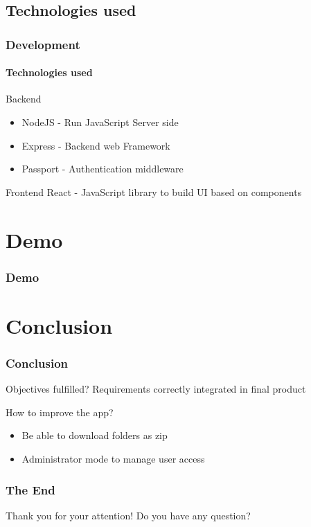 \documentclass{beamer}
\begin{document}
	\subsection{Technologies used}
	\begin{frame}
		\frametitle{Development}
		\framesubtitle{Technologies used}
		\begin{alertblock}{Backend}
			\begin{itemize}
				\item NodeJS - Run JavaScript Server side
				\item Express - Backend web Framework
				\item Passport - Authentication middleware
			\end{itemize}
		\end{alertblock}
		
		\begin{alertblock}{Frontend}
			React - JavaScript library to build UI based on components
		\end{alertblock}
	\end{frame}
	
	\section{Demo}
	\begin{frame}
		\frametitle{Demo}
	\end{frame}
	
	\section{Conclusion}
	\begin{frame}
		\frametitle{Conclusion}
		
		\begin{alertblock}{Objectives fulfilled?}
			Requirements correctly integrated in final product
		\end{alertblock}
		
		\begin{alertblock}{How to improve the app?}
			\begin{itemize}
				\item Be able to download folders as zip
				\item Administrator mode to manage user access
			\end{itemize}
		\end{alertblock}
	\end{frame}
	
	\begin{frame}
		\frametitle{The End}
		
		\centering
		Thank you for your attention!
		\linebreak
		Do you have any question?
	\end{frame}
\end{document}
